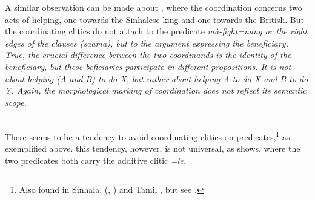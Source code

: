 A similar observation can be made about , where the coordination concerns two acts of helping, one towards the Sinhalese king and one towards the British. But the coordinating clitics do not attach to the predicate \em mà-fight=nang \em or  the right edges of the clauses (\em saama\em), but to the argument expressing the beneficiary. True, the crucial difference between the two coordinands is the identity of the beneficiary, but these beficiaries participate in different propositions. It is not about helping (A and B) to do X, but rather about helping A to do X and B to do Y. Again, the morphological marking of coordination does not reflect its semantic scope.

 \\

There seems to be a tendency to avoid coordinating clitics on predicates,\footnote{Also found in Sinhala,   (\citet[46]{GairEtAl1997}, \citet[808]{Gair2003}) and Tamil  \citep[162]{Lehmann1989}, but see \citet[70]{Karunatillake2004}.} as exemplified above. this tendency, however, is not universal, as  shows, where the two predicates  both carry the additive clitic \em =le\em.



